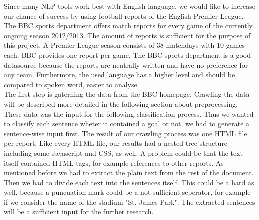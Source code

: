 \documentclass[11pt,titlepage,oneside,openany]{book}
\begin{document}
Since many NLP tools work best with English language, we would like to increase our chance of success by using football reports of the English Premier League. The BBC sports department offers match reports for every game of the currently ongoing season 2012/2013. The amount of reports is sufficient for the purpose of this project. A Premier League season consists of 38 matchdays with 10 games each. BBC provides one report per game. The BBC sports department is a good datasource because the reports are neutrally written and have no preference for any team. Furthermore, the used language has a higher level and should be, compared to spoken word, easier to analyse. \\
The first step is gaterhing the data from the BBC homepage. Crawling the data will be described more detailed in the following section about preprocessing. These data was the input for the following classification process. Thus we wanted to classify each sentence wheter it contained a goal or not, we had to generate a sentence-wise input first.  The result of our crawling process was one HTML file per report. Like every HTML file, our results had a nested tree structure including some Javascript and CSS, as well. A problem could be that the text itself contained HTML tags, for example references to other reports. As mentioned before we had to extract the plain text from the rest of the document. Then we had to divide each text into the sentences itself. This could be a hard as well, because a puncuation mark could be a not sufficient seperator, for example if we consider the name of the stadium "St. James Park". The extracted sentences will be a sufficient input for the further research.
\end{document}
